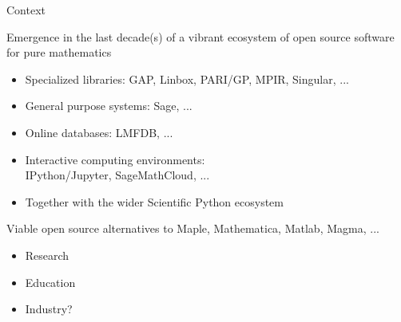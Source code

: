 \documentclass[
  usenames,svgnames, %
  compress,
  ]{beamer}
\begin{document}
\begin{frame}{Context}
  \begin{block}{Emergence in the last decade(s) of a vibrant ecosystem
      of open source software for pure mathematics}

    \begin{itemize}
    \item Specialized libraries: GAP, Linbox, PARI/GP, MPIR, Singular,
      ...
    \item General purpose systems: Sage, ...
    \item Online databases: LMFDB, ...
    \item Interactive computing environments:\\
      IPython/Jupyter, SageMathCloud, ...
    \item Together with the wider Scientific Python ecosystem
    \end{itemize}
  \end{block}
  \pause
  \bigskip

  \begin{block}{Viable open source alternatives to Maple, Mathematica,
      Matlab, Magma, ...}
    \begin{itemize}
    \item Research
    \item Education
    \item Industry?
    \end{itemize}
  \end{block}
\end{frame}
\end{document}
